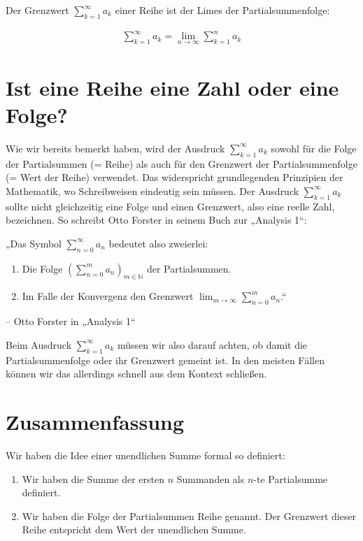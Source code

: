 \documentclass[fontsize=9pt,
               parskip=half-,
               DIV=14,
               listof=chapterentry,
               tocflat]{scrbook}
\begin{document}
\begin{definition*}
Der Grenzwert $\sum _{k=1}^{\infty }a_{k}$ einer Reihe ist der Limes der Partialsummenfolge:

\begin{align*}
\sum _{k=1}^{\infty }a_{k}=\lim _{n\to \infty }\sum _{k=1}^{n}a_{k}
\end{align*}

\end{definition*}

\section{Ist eine Reihe eine Zahl oder eine Folge?}

Wie wir bereits bemerkt haben, wird der Ausdruck $\sum _{k=1}^{\infty }a_{k}$ sowohl für die Folge der Partialsummen (= Reihe) als auch für den Grenzwert der Partialsummenfolge (= Wert der Reihe) verwendet. Das widerspricht grundlegenden Prinzipien der Mathematik, wo Schreibweisen eindeutig sein müssen. Der Ausdruck $\sum _{k=1}^{\infty }a_{k}$ sollte nicht gleichzeitig eine Folge und einen Grenzwert, also eine reelle Zahl, bezeichnen. So schreibt Otto Forster in seinem Buch zur „Analysis 1“:

\begin{displayquote}
„Das Symbol $\sum _{n=0}^{\infty }a_{n}$ bedeutet also zweierlei: \begin{enumerate}
\item Die Folge $\left(\sum _{n=0}^{m}a_{n}\right)_{m\in \mathbb {N} }$ der Partialsummen.
\item Im Falle der Konvergenz den Grenzwert $\lim _{m\to \infty }\sum _{n=0}^{m}a_{n}$.“
\end{enumerate}

 – Otto Forster in „Analysis 1“\end{displayquote}

Beim Ausdruck $\sum _{k=1}^{\infty }a_{k}$ müssen wir also darauf achten, ob damit die Partialsummenfolge oder ihr Grenzwert gemeint ist. In den meisten Fällen können wir das allerdings schnell aus dem Kontext schließen.
\clearpage
\section{Zusammenfassung}

Wir haben die Idee einer unendlichen Summe formal so definiert:

\begin{enumerate}
\item Wir haben die Summe der ersten $n$ Summanden als $n$-te Partialsumme definiert.
\item Wir haben die Folge der Partialsummen Reihe genannt. Der Grenzwert dieser Reihe entspricht dem Wert der unendlichen Summe.
\end{enumerate}
\end{document}
